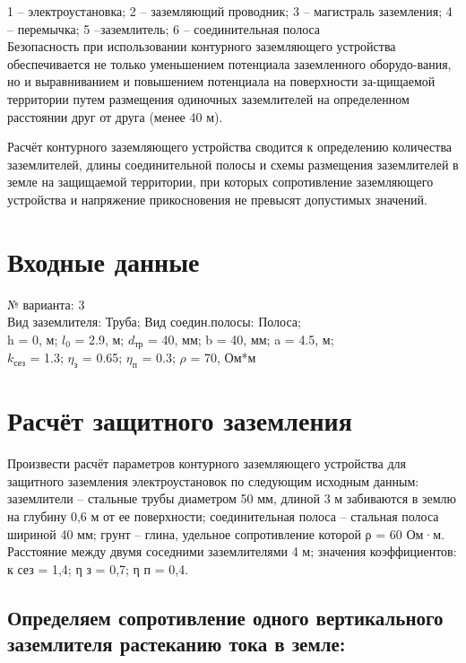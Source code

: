 1 – электроустановка; 2 – заземляющий проводник; 3 – магистраль заземления; 4 – перемычка; 5 –заземлитель; 6 – соединительная полоса
\\

Безопасность при использовании контурного заземляющего устройства обеспечивается не только уменьшением потенциала заземленного оборудо-вания, но и выравниванием и повышением потенциала на поверхности за-щищаемой территории путем размещения одиночных заземлителей на определенном расстоянии друг от друга (менее 40 м).

Расчёт контурного заземляющего устройства сводится к определению количества заземлителей, длины соединительной полосы и схемы размещения заземлителей в земле на защищаемой территории, при которых сопротивление заземляющего устройства и напряжение прикосновения не превысят допустимых значений.

\section{Входные данные}

№ варианта: 3\\
Вид заземлителя: Труба; Вид соедин.полосы: Полоса;\\
h = 0, м; $l_0$ = 2.9, м; $d_\text{тр}$ = 40, мм; b = 40, мм; a = 4.5, м;\\
$k_\text{сез}$ = 1.3; $\eta_\text{з}$ = 0.65; $\eta_\text{п}$ = 0.3; $\rho$ = 70, Ом*м \\ 

\section{Расчёт защитного заземления}

Произвести расчёт параметров контурного
заземляющего устройства для защитного заземления электроустановок по
следующим исходным данным: заземлители – стальные трубы диаметром
50 мм, длиной 3 м забиваются в землю на глубину 0,6 м от ее поверхности;
соединительная полоса – стальная полоса шириной 40 мм; грунт – глина,
удельное сопротивление которой ρ = 60 Ом·м. Расстояние между двумя
соседними заземлителями 4 м; значения коэффициентов: к сез = 1,4; η з = 0,7;
η п = 0,4.

\subsection{Определяем сопротивление одного вертикального заземлителя растеканию тока в земле:}


